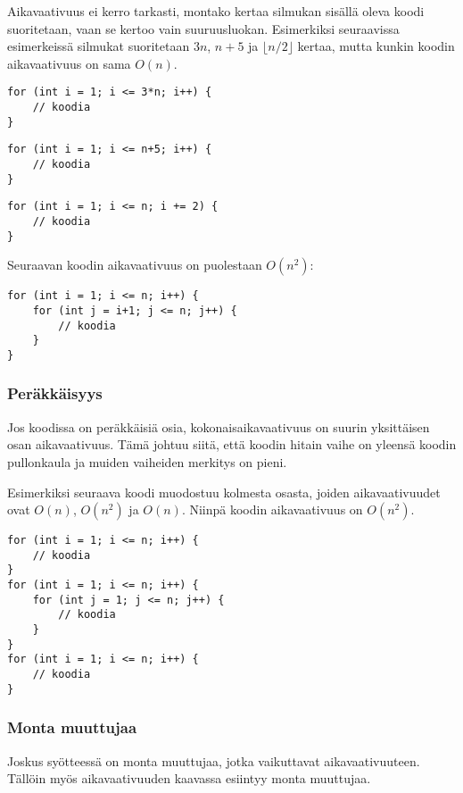 Aikavaativuus ei kerro tarkasti,
montako kertaa silmukan sisällä oleva koodi suoritetaan,
vaan se kertoo vain suuruusluokan.
Esimerkiksi seuraavissa esimerkeissä silmukat
suoritetaan $3n$, $n+5$ ja $\lfloor n/2 \rfloor$ kertaa,
mutta kunkin koodin aikavaativuus on sama $O(n)$.

\begin{lstlisting}
for (int i = 1; i <= 3*n; i++) {
    // koodia
}
\end{lstlisting}

\begin{lstlisting}
for (int i = 1; i <= n+5; i++) {
    // koodia
}
\end{lstlisting}

\begin{lstlisting}
for (int i = 1; i <= n; i += 2) {
    // koodia
}
\end{lstlisting}

Seuraavan koodin aikavaativuus on puolestaan $O(n^2)$:

\begin{lstlisting}
for (int i = 1; i <= n; i++) {
    for (int j = i+1; j <= n; j++) {
        // koodia
    }
}
\end{lstlisting}

\subsubsection*{Peräkkäisyys}

Jos koodissa on peräkkäisiä osia,
kokonaisaikavaativuus on suurin yksittäisen
osan aikavaativuus.
Tämä johtuu siitä, että koodin hitain
vaihe on yleensä koodin pullonkaula
ja muiden vaiheiden merkitys on pieni.

Esimerkiksi seuraava koodi muodostuu
kolmesta osasta,
joiden aikavaativuudet ovat $O(n)$, $O(n^2)$ ja $O(n)$.
Niinpä koodin aikavaativuus on $O(n^2)$.

\begin{lstlisting}
for (int i = 1; i <= n; i++) {
    // koodia
}
for (int i = 1; i <= n; i++) {
    for (int j = 1; j <= n; j++) {
        // koodia
    }
}
for (int i = 1; i <= n; i++) {
    // koodia
}
\end{lstlisting}

\subsubsection*{Monta muuttujaa}

Joskus syötteessä on monta muuttujaa,
jotka vaikuttavat aikavaativuuteen.
Tällöin myös aikavaativuuden kaavassa esiintyy
monta muuttujaa.

